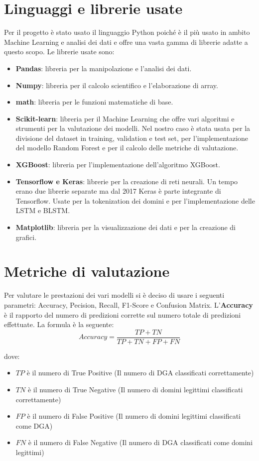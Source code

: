\documentclass[12pt,a4paper,openright,twoside]{book}
\begin{document}
\section{Linguaggi e librerie usate}
Per il progetto è stato usato il linguaggio Python poiché è il più usato
in ambito Machine Learning e analisi dei dati e offre una vasta gamma di librerie
adatte a questo scopo. Le librerie usate sono:
\begin{itemize}
    \item \textbf{Pandas}: libreria per la manipolazione e l'analisi dei dati.
    \item \textbf{Numpy}: libreria per il calcolo scientifico e l'elaborazione di array.
    \item \textbf{math}: libreria per le funzioni matematiche di base.
    \item \textbf{Scikit-learn}: libreria per il Machine Learning che offre vari algoritmi
    e strumenti per la valutazione dei modelli. Nel nostro caso è stata usata per 
    la divisione del dataset in training, validation e test set,
    per l'implementazione del modello Random Forest e per il calcolo delle metriche di valutazione.
    \item \textbf{XGBoost}: libreria per l'implementazione dell'algoritmo XGBoost.
    \item \textbf{Tensorflow e Keras}: librerie per la creazione di reti neurali. Un tempo erano due librerie
    separate ma dal 2017 Keras è parte integrante di Tensorflow. 
    Usate per la tokenization dei domini e per l'implementazione delle LSTM e BLSTM.
    \item \textbf{Matplotlib}: libreria per la visualizzazione dei dati e per la creazione di grafici.
\end{itemize}

\section{Metriche di valutazione}
Per valutare le prestazioni dei vari modelli si è deciso di usare i seguenti
parametri:
Accuracy, Pecision, Recall, F1-Score e Confusion Matrix. \hfill \break
L'\textbf{Accuracy} è il rapporto del numero di predizioni
corrette sul numero totale di predizioni effettuate.
La formula è la seguente:
\begin{equation}
    Accuracy = \frac{TP + TN}{TP + TN + FP + FN}
\end{equation}

dove:
\begin{itemize}
    \item $TP$ è il numero di True Positive (Il numero di DGA classificati correttamente)
    \item $TN$ è il numero di True Negative (Il numero di domini legittimi classificati correttamente)
    \item $FP$ è il numero di False Positive (Il numero di domini legittimi classificati come DGA)
    \item $FN$ è il numero di False Negative (Il numero di DGA classificati come domini legittimi)
\end{itemize}
\end{document}
